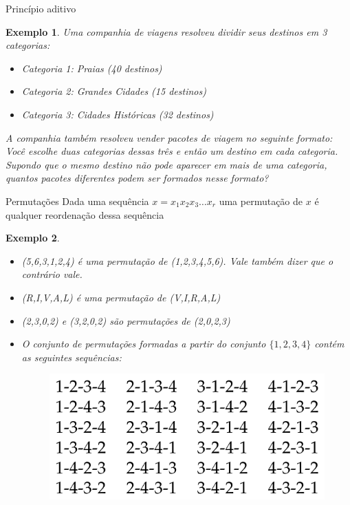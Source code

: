 \documentclass{beamer}
\newtheorem{exemplo}{Exemplo}
\begin{document}
\begin{frame}{Princípio aditivo}

\begin{exemplo}
    Uma companhia de viagens resolveu dividir seus destinos em 3 categorias:
    \begin{itemize}
        \item Categoria 1: Praias (40 destinos)
        \item Categoria 2: Grandes Cidades (15 destinos)
        \item Categoria 3: Cidades Históricas (32 destinos)
    \end{itemize}

    A companhia também resolveu vender pacotes de viagem no seguinte formato: Você escolhe duas categorias dessas três e então um destino em cada categoria. Supondo que o mesmo destino não pode aparecer em mais de uma categoria, quantos pacotes diferentes podem ser formados nesse formato? 
    
\end{exemplo}
\end{frame}

\begin{frame}{Permutações}
    Dada uma sequência $x=x_1x_2x_3 \dots x_r$ uma permutação de $x$ é qualquer reordenação dessa sequência 

    \begin{exemplo}
    \begin{itemize}
        \item (5,6,3,1,2,4) é uma permutação de (1,2,3,4,5,6). Vale também dizer que o contrário vale.
        \item (R,I,V,A,L) é uma permutação de (V,I,R,A,L)
        \item (2,3,0,2) e (3,2,0,2) são permutações de (2,0,2,3)
        \item O conjunto de permutações formadas a partir do conjunto $\{1,2,3,4\}$ contém as seguintes sequências:
        \begin{figure}
            \centering
            \includegraphics[width=0.5\linewidth]{figures/pem_1234.png}
        \end{figure}
    \end{itemize}
    \end{exemplo}
\end{frame}
\end{document}
